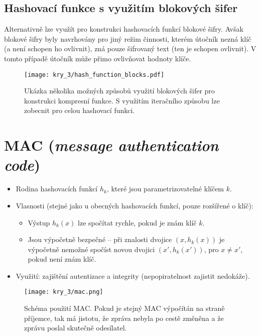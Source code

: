 \subsection*{Hashovací funkce s využitím blokových šifer}

Alternativně lze využít pro konstrukci hashovacích funkcí blokové šifry. Avšak blokové šifry byly navrhovány pro jiný režim činnosti, kterém útočník nezná klíč (a není schopen ho ovlivnit), zná pouze šifrovaný text (ten je schopen ovlivnit). V tomto případě útočník může přimo ovlivňovat hodnoty klíče.

\begin{figure}[H]
    \centering
    \texttt{[image: kry\_3/hash\_function\_blocks.pdf]}
    \caption{Ukázka několika možných způsobů využití blokových šifer pro konstrukci kompresní funkce. S využitím iteračního způsobu lze zobecnit pro celou hashovací funkci.}
\end{figure}


\section{MAC (\textit{message authentication code})}

\begin{itemize}
    \item Rodina hashovacích funkcí $h_k$, které jsou parametrizovatelné klíčem $k$.
    \item Vlasnosti (stejné jako u obecných hashovacích funkcí, pouze rozšířené o klíč): \begin{itemize}
        \item Výstup $h_k(x)$ lze spočítat rychle, pokud je znám klíč $k$.
        \item Jsou výpočetně bezpečné -- při znalosti dvojice $(x, h_k(x))$ je výpočetně nemožné spočíst novou dvojici $(x', h_k(x'))$, pro $x \neq x'$, pokud není znám klíč.
    \end{itemize}
    \item Využití: zajištění autentizace a integrity (nepopiratelnost zajistit nedokáže).
\end{itemize}

\begin{figure}[H]
    \centering
    \texttt{[image: kry\_3/mac.png]}
    \caption{Schéma použití MAC. Pokud je stejný MAC výpočítán na straně příjemce, tak má jistotu, že zpráva nebyla po cestě změněna a že zprávu poslal skutečně odesílatel.}
\end{figure}

